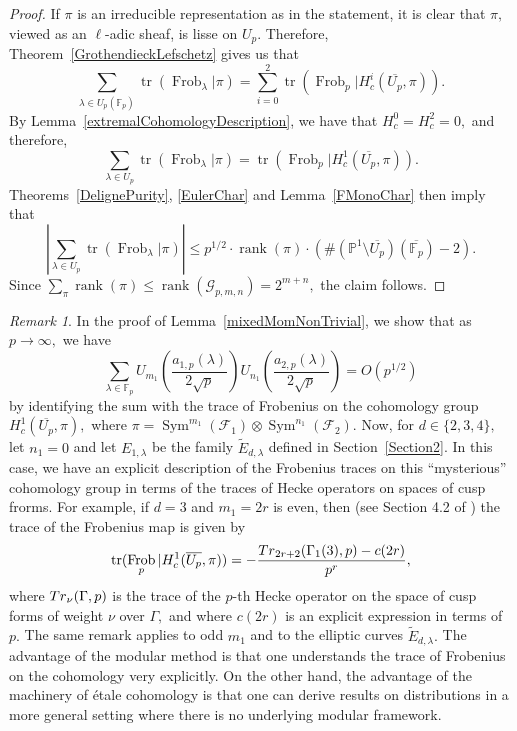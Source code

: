 \documentclass[12pt]{amsart}
\theoremstyle{definition}
\theoremstyle{remark}
\newtheorem{remark}[theorem]{Remark}
\numberwithin{equation}{section}
\def\Tr{{\rm Tr}}
\def\F{{\mathbb F}}
\def\F{\mathbb{F}}
\DeclareMathOperator{\Frob}{Frob}
\DeclareMathOperator{\tr}{tr}
\DeclareMathOperator{\rank}{rank}
\DeclareMathOperator{\Sym}{Sym}
\begin{document}
\begin{proof}
    If $\pi$ is an irreducible representation as in the statement, it is clear that $\pi,$ viewed as an $\ell$-adic sheaf, is lisse on $U_p.$ Therefore, Theorem~\ref{GrothendieckLefschetz} gives us that
    $$
    \sum\limits_{\lambda\in U_p(\F_p)}\tr(\Frob_\lambda|\pi)=\sum\limits_{i=0}^2\tr(\Frob_p|H_c^i(\overline{U_p},\pi)).
    $$
    By Lemma~\ref{extremalCohomologyDescription}, we have that $H_c^0=H_c^2=0,$ and therefore,
    $$
    \sum\limits_{\lambda\in U_p}\tr(\Frob_\lambda|\pi)=\tr(\Frob_p|H_c^1(\overline{U_p},\pi)).
    $$
    Theorems~\ref{DelignePurity}, \ref{EulerChar} and Lemma~\ref{FMonoChar} then imply that
    $$
    \left|\sum\limits_{\lambda\in U_p}\tr(\Frob_\lambda|\pi)\right|\leq p^{1/2}\cdot\rank(\pi)\cdot(\#(\mathbb{P}^1\setminus\overline{U_p})(\overline{\F_p})-2).
    $$
    Since $\sum\limits_{\pi}\rank(\pi)\leq\rank(\mathcal{G}_{p,m,n})=2^{m+n},$ the claim follows.
\end{proof}

\begin{remark}\label{Hc1ModRemark}
    In the proof of Lemma~\ref{mixedMomNonTrivial}, we show that as $p\to\infty,$ we have
    $$
    \sum\limits_{\lambda\in\F_p} U_{m_1}\left(\frac{a_{1,p}(\lambda)}{2\sqrt{p}}\right)U_{n_1}\left(\frac{a_{2,p}(\lambda)}{2\sqrt{p}}\right) = O(p^{1/2})
    $$
    by identifying the sum with the trace of Frobenius on the cohomology group $H_c^1(\overline{U_p},\pi),$ where $\pi=\Sym^{m_1}(\mathcal{F}_1)\otimes\Sym^{n_1}(\mathcal{F}_2).$
    Now, for $d\in\{2,3,4\},$ let $n_1=0$ and let $E_{1,\lambda}$ be the family $\widetilde{E}_{d,\lambda}$ defined in Section~\ref{Section2}. In this case, we have an explicit description of the Frobenius traces on this ``mysterious'' cohomology group in terms of the traces of Hecke operators on spaces of cusp frorms. For example, if $d=3$ and $m_1=2r$ is even, then (see Section 4.2 of \cite{grove2024hypergeometricmomentshecketrace}) the trace of the Frobenius map is given by 
    $$
    \tr(\Frob_p|H_c^1(\overline{U_p},\pi))=-\frac{\Tr_{2r+2}(\Gamma_1(3),p)-c(2r)}{p^r},
    $$
    where $\Tr_{\nu}(\Gamma,p)$ is the trace of the $p$-th Hecke operator on the space of cusp forms of weight $\nu$ over $\Gamma,$ and where $c(2r)$ is an explicit expression in terms of $p.$  The same remark applies to odd $m_1$ and to the elliptic curves $\widetilde{E}_{d,\lambda}.$ The advantage of the modular method is that one understands the trace of Frobenius on the cohomology very explicitly. On the other hand, the advantage of the machinery of \'etale cohomology is that one can derive results on distributions in a more general setting where there is no underlying modular framework.
\end{remark}
\end{document}
